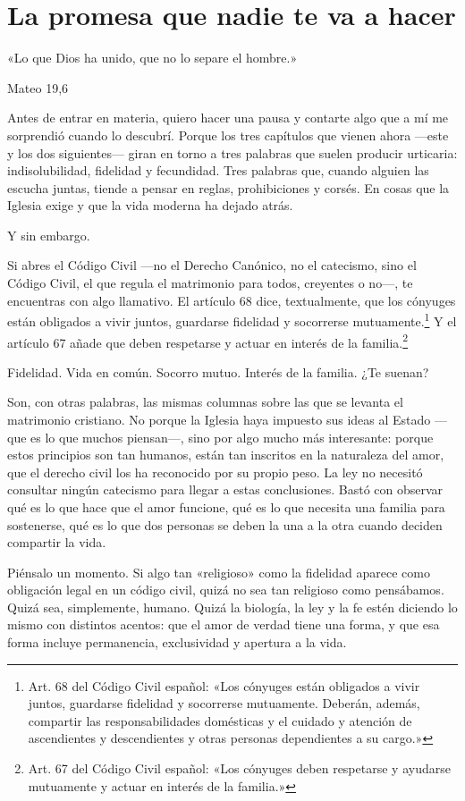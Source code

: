 \chapter{La promesa que nadie te va a hacer}

\epigraph{«Lo que Dios ha unido, que no lo separe el hombre.»}{Mateo 19,6}

Antes de entrar en materia, quiero hacer una pausa y contarte algo que a mí me sorprendió cuando lo descubrí. Porque los tres capítulos que vienen ahora ---este y los dos siguientes--- giran en torno a tres palabras que suelen producir urticaria: indisolubilidad, fidelidad y fecundidad. Tres palabras que, cuando alguien las escucha juntas, tiende a pensar en reglas, prohibiciones y corsés. En cosas que la Iglesia exige y que la vida moderna ha dejado atrás.

Y sin embargo.

Si abres el Código Civil ---no el Derecho Canónico, no el catecismo, sino el Código Civil, el que regula el matrimonio para todos, creyentes o no---, te encuentras con algo llamativo. El artículo 68 dice, textualmente, que los cónyuges están obligados a vivir juntos, guardarse fidelidad y socorrerse mutuamente.\footnote{Art. 68 del Código Civil español: «Los cónyuges están obligados a vivir juntos, guardarse fidelidad y socorrerse mutuamente. Deberán, además, compartir las responsabilidades domésticas y el cuidado y atención de ascendientes y descendientes y otras personas dependientes a su cargo.»} Y el artículo 67 añade que deben respetarse y actuar en interés de la familia.\footnote{Art. 67 del Código Civil español: «Los cónyuges deben respetarse y ayudarse mutuamente y actuar en interés de la familia.»}

Fidelidad. Vida en común. Socorro mutuo. Interés de la familia. ¿Te suenan?

Son, con otras palabras, las mismas columnas sobre las que se levanta el matrimonio cristiano. No porque la Iglesia haya impuesto sus ideas al Estado ---que es lo que muchos piensan---, sino por algo mucho más interesante: porque estos principios son tan humanos, están tan inscritos en la naturaleza del amor, que el derecho civil los ha reconocido por su propio peso. La ley no necesitó consultar ningún catecismo para llegar a estas conclusiones. Bastó con observar qué es lo que hace que el amor funcione, qué es lo que necesita una familia para sostenerse, qué es lo que dos personas se deben la una a la otra cuando deciden compartir la vida.

Piénsalo un momento. Si algo tan «religioso» como la fidelidad aparece como obligación legal en un código civil, quizá no sea tan religioso como pensábamos. Quizá sea, simplemente, humano. Quizá la biología, la ley y la fe estén diciendo lo mismo con distintos acentos: que el amor de verdad tiene una forma, y que esa forma incluye permanencia, exclusividad y apertura a la vida.

